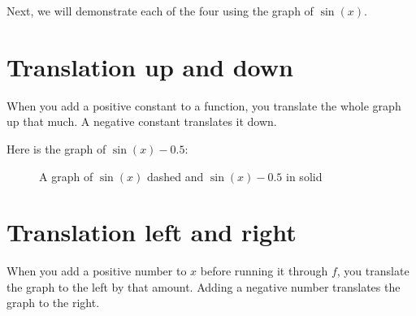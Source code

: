 Next, we will demonstrate each of the four using the graph of $\sin(x)$.

\section{Translation up and down}

When you add a positive constant to a function, you translate the
whole graph up that much. A negative constant translates it down.

Here is the graph of $\sin(x) - 0.5$:


\begin{figure}[htbp]
    \centering

        \caption{A graph of $\sin(x)$ dashed and $\sin(x)-0.5$ in solid}
    \label{fig:translationDown}
\end{figure}


\section{Translation left and right}

When you add a positive number to $x$ before running it through $f$,
you translate the graph to the left by that amount. Adding a negative
number translates the graph to the right.

